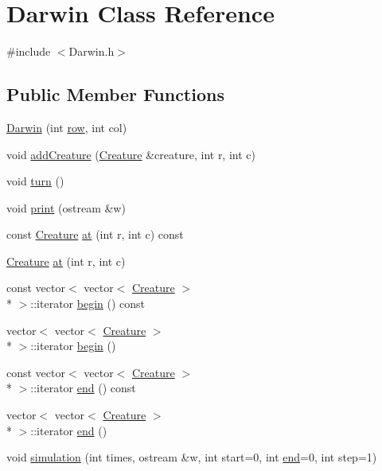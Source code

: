 \hypertarget{classDarwin}{\section{Darwin Class Reference}
\label{classDarwin}
}


{\ttfamily \#include $<$Darwin.\-h$>$}

\subsection*{Public Member Functions}
\begin{DoxyCompactItemize}
\item 
\hyperlink{classDarwin_ac1cbdea8e74dc140ba7a16558776e01b}{Darwin} (int \hyperlink{classDarwin_a61b2dd87961ab46d2a567fd350054abd}{row}, int col)
\item 
void \hyperlink{classDarwin_a828c76c63708df1ff877c8564ce52f0c}{add\-Creature} (\hyperlink{classCreature}{Creature} \&creature, int r, int c)
\item 
void \hyperlink{classDarwin_a31afe2dd9b1c0621f9b21c02ef2a2c98}{turn} ()
\item 
void \hyperlink{classDarwin_a61e92c982448f89a657130b223cf2816}{print} (ostream \&w)
\item 
const \hyperlink{classCreature}{Creature} \hyperlink{classDarwin_a2e1fa6a0aada199d63e78caab111ee80}{at} (int r, int c) const 
\item 
\hyperlink{classCreature}{Creature} \hyperlink{classDarwin_a89affefc7a706f8fc0d2599958c24e27}{at} (int r, int c)
\item 
const vector$<$ vector$<$ \hyperlink{classCreature}{Creature} $>$\\*
 $>$\-::iterator \hyperlink{classDarwin_a2b292091a8d25ad8524b553e609bc751}{begin} () const 
\item 
vector$<$ vector$<$ \hyperlink{classCreature}{Creature} $>$\\*
 $>$\-::iterator \hyperlink{classDarwin_a7515ab241b683a3f20feaa333d549746}{begin} ()
\item 
const vector$<$ vector$<$ \hyperlink{classCreature}{Creature} $>$\\*
 $>$\-::iterator \hyperlink{classDarwin_a4944be4f11cc8767343bdf5cfcadefd4}{end} () const 
\item 
vector$<$ vector$<$ \hyperlink{classCreature}{Creature} $>$\\*
 $>$\-::iterator \hyperlink{classDarwin_adf31a66f90ef0e6eff158417d6d7dfc8}{end} ()
\item 
void \hyperlink{classDarwin_ab7986cfa21314919b8af6a1054017217}{simulation} (int times, ostream \&w, int start=0, int \hyperlink{classDarwin_a4944be4f11cc8767343bdf5cfcadefd4}{end}=0, int step=1)
\end{DoxyCompactItemize}
